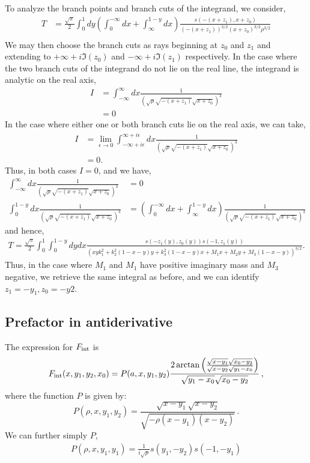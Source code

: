 \documentclass[twoside]{article}
\begin{document}
To analyze the branch points and branch cuts of the integrand, we consider,
\begin{align}
  T &=  \frac{\sqrt{\pi}}{2}\int^1_0dy\left( \int^{-\infty}_0dx + \int^{1-y}_{\infty}dx
  \right)\frac{s(-(x+z_1),x+z_0)}{(-(x+z_1))^{3/2}(x+z_0)^{3/2}\rho^{3/2}}\\
\end{align}
We may then choose the branch cuts as rays beginning at $z_0$ and $z_1$ and extending to $+\infty + i\Im(z_0)$ and $-\infty + i\Im(z_1)$
respectively. In the case where the two branch cuts of the integrand do not lie on the real line, the integrand is analytic on the real
axis, 
\begin{align}
  I &=  \int^{\infty}_{-\infty}dx\frac{1}{\left( \sqrt{\rho}\sqrt{-(x + z_1)}\sqrt{x + z_0} \right)^3} \\
  &= 0
\end{align}
In the case where either one or both branch cuts lie on the real axis, we can take,
\begin{align}
  I &=  \lim_{\epsilon \rightarrow 0}\int^{\infty + i\epsilon}_{-\infty + i\epsilon}dx \frac{1}{\left( \sqrt{\rho}\sqrt{-(x + z_1)}
  \sqrt{x + z_0} \right)^3}\\
  &= 0.
\end{align}
Thus, in both cases $I = 0$, and we have,
\begin{align}
  \int^{\infty}_{-\infty}dx\frac{1}{\left( \sqrt{\rho}\sqrt{-(x + z_1)}\sqrt{x + z_0} \right)^3} &=  0\\
  \int^{1-y}_{0}dx\frac{1}{\left( \sqrt{\rho}\sqrt{-(x + z_1)}\sqrt{x + z_0} \right)^3} &=  \left( \int^{-\infty}_0dx +  \int^{1-y}_{\infty}
  dx\right)\frac{1}{\left( \sqrt{\rho}\sqrt{-(x + z_1)}\sqrt{x + z_0} \right)^3}
\end{align}
and hence,
\begin{align}
  T =  \frac{\sqrt{\pi}}{2}\int^{1}_0\int^{1-y}_{0}dydx\frac{ s(-z_1(y),z_0(y))s(-1,z_1(y))}{\left( xyk^2_1+k^2_2(1 - x - y)y + k^2_3(1 - x - y)x + M_1x + M_2y + M_3(1 - x - y)
  \right)^{3/2}}.
\end{align}
Thus, in the case where $M_1$ and $M_1$ have positive imaginary mass and $M_3$ negative, we retrieve the same integral as before, and we can
identify $z_1 = -y_1, z_0 = -y2$.  
\subsection{Prefactor in antiderivative}

The expression for $F_{\rm int}$ is
\begin{equation}
F_{\rm int}(x,y_1,y_2,x_0) = P(a,x,y_1,y_2)\frac{2 \arctan\left(\frac{\sqrt{x-y_1} \sqrt{x_0-y_2}}{\sqrt{x-y_2} \sqrt{y_1-x_0}}\right)}{\sqrt{y_1 - x_0}\sqrt{x_0 - y_2}}\,,
\end{equation}
where the function $P$ is given by:
\begin{equation}
P(\rho,x,y_1,y_2)=\frac{\sqrt{x-y_1} \sqrt{x-y_2}}{\sqrt{-\rho (x-y_1) (x-y_2)}}\,.
\end{equation}
We can further simply $P$,
\begin{align}
  P(\rho,x,y_1,y_1) = \frac{1}{i\sqrt{\rho}}s(y_1,-y_2)s(-1,-y_1)
\end{align}
\end{document}
